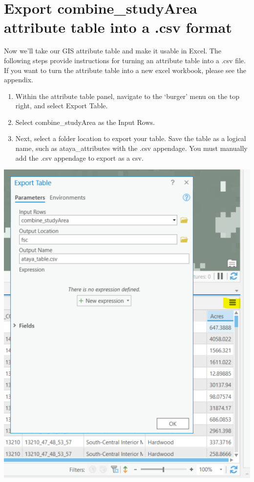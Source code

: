 \documentclass[
]{book}
\providecommand{\tightlist}{%
  \setlength{\itemsep}{0pt}\setlength{\parskip}{0pt}}
\begin{document}
\hypertarget{export-combine_studyarea-attribute-table-into-a-.csv-format}{%
\section{Export combine\_studyArea attribute table into a .csv format}\label{export-combine_studyarea-attribute-table-into-a-.csv-format}}

Now we'll take our GIS attribute table and make it usable in Excel. The following steps provide instructions for turning an attribute table into a .csv file. If you want to turn the attribute table into a new excel workbook, please see the appendix.

\begin{enumerate}
\def\labelenumi{\arabic{enumi}.}
\tightlist
\item
  Within the attribute table panel, navigate to the `burger' menu on the top right, and select Export Table.
\item
  Select combine\_studyArea as the Input Rows.
\item
  Next, select a folder location to export your table. Save the table as a logical name, such as ataya\_attributes with the .csv appendage. You must manually add the .csv appendage to export as a csv.
\end{enumerate}

\includegraphics[width=1000px]{04_gis_screenshots/18_export_table}
\end{document}
